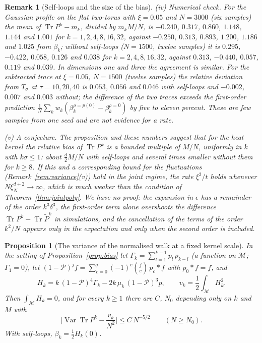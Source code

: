 \documentclass[11pt,a4paper]{article}
\theoremstyle{stmt}
\newtheorem{proposition}[theorem]{Proposition}
\theoremstyle{defn}
\theoremstyle{rmk}
\newtheorem{remark}[theorem]{Remark}
\numberwithin{equation}{section}
\DeclareMathOperator{\Tr}{Tr}
\newcommand{\M}{\mathcal{M}}
\begin{document}
{\begin{remark}[Self-loops and the size of the bias]
(iv) \emph{Numerical check.} For the Gaussian profile on the flat two-torus with $\xi=0.05$ and $N=3000$ (six samples) the mean of $\Tr P^k-m_k$, divided by $m_kM/N$, is $-0.240$, $0.317$, $0.860$, $1.148$, $1.144$ and $1.001$ for $k=1,2,4,8,16,32$, against $-0.250$, $0.313$, $0.893$, $1.200$, $1.186$ and $1.025$ from $\beta_k$; without self-loops ($N=1500$, twelve samples) it is $0.295$, $-0.422$, $0.058$, $0.126$ and $0.038$ for $k=2,4,8,16,32$, against $0.313$, $-0.440$, $0.057$, $0.119$ and $0.039$. In dimensions one and three the agreement is similar. For the subtracted trace at $\xi=0.05$, $N=1500$ (twelve samples) the relative deviation from $T_\sigma$ at $\tau=10,20,40$ is $0.053$, $0.056$ and $0.046$ with self-loops and $-0.002$, $0.007$ and $0.003$ without; the difference of the two traces exceeds the first-order prediction $\frac1N\sum_kw_k(\beta_k^{\rho=p(0)}-\beta_k^{\rho=0})$ by five to eleven percent. These are few samples from one seed and are not evidence for a rate.

(v) \emph{A conjecture.} The proposition and these numbers suggest that for the heat kernel the relative bias of $\Tr P^k$ is a bounded multiple of $M/N$, uniformly in $k$ with $k\sigma\le1$: about $\tfrac d2M/N$ with self-loops and several times smaller without them for $k\ge8$. If this and a corresponding bound for the fluctuations (Remark~\ref{rem:variance}(v)) hold in the joint regime, the rate $\xi^2/t$ holds whenever $N\xi_N^{d+2}\to\infty$, which is much weaker than the condition of Theorem~\ref{thm:jointpoly}. We have no proof: the expansion in $\epsilon$ has a remainder of the order $k^3\delta^3$, the first-order term alone overshoots the difference $\Tr P^k-\Tr\tilde P^k$ in simulations, and the cancellation of the terms of the order $k^2/N$ appears only in the expectation and only when the second order is included.
\end{remark}

\begin{proposition}[The variance of the normalised walk at a fixed kernel scale]\label{prop:variance}
In the setting of Proposition~\ref{prop:bias} let $\Gamma_k=\sum_{l=1}^{k-1}p_l\,p_{k-l}$ (a function on $\M$; $\Gamma_1=0$), let $(1-\mathcal P)^jf=\sum_{c=0}^j(-1)^c\binom jc\,p_c*f$ with $p_0*f=f$, and
\[
H_k=k\,(1-\mathcal P)^4\Gamma_k-2k\,\mu_k\,(1-\mathcal P)^3p,\qquad v_k=\frac12\int_\M H_k^2 .
\]
Then $\int_\M H_k=0$, and for every $k\ge1$ there are $C$, $N_0$ depending only on $k$ and $M$ with
\[
\Big|\operatorname{Var}\Tr P^k-\frac{v_k}{N^2}\Big|\le C\,N^{-5/2}\qquad(N\ge N_0).
\]
With self-loops, $\beta_k=\frac12H_k(0)$.
\end{proposition}

}
\end{document}
